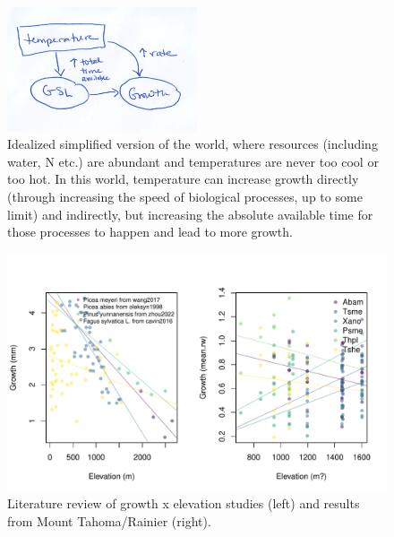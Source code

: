 \documentclass[11pt]{article}
\begin{document}
\begin{figure}[h!]
\includegraphics[width=0.5\textwidth]{..//figures/gsltogrowth/gsltogrowth_emw1a.png}
\caption{Idealized simplified version of the world, where resources (including water, N etc.) are abundant and temperatures are never too cool or too hot. In this world, temperature can increase growth directly (through increasing the speed of biological processes, up to some limit) and indirectly, but increasing the absolute available time for those processes to happen and lead to more growth.}
\label{fig:concepbiotime}
\end{figure}


\begin{figure}[h!]
\includegraphics[width=1\textwidth]{..//analyses/growthxelevationetc/figures/growthxelev2part.pdf}
\caption{Literature review of growth x elevation studies (left) and results from Mount Tahoma/Rainier (right).}
\label{fig:gxelev}
\end{figure}
\end{document}
